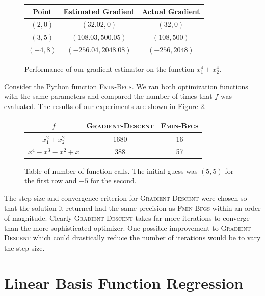 \documentclass{sigchi}
\begin{document}
\begin{figure}
\def\arraystretch{1.5}

\begin{center}
\begin{tabular}{| c | c | c |}
\hline
Point & Estimated Gradient& Actual Gradient\\
\hline
$(2, 0)$& $(32.02, 0)$ & $(32, 0)$ \\
\hline
$(3, 5)$& $(108.03, 500.05)$ &$(108, 500)$\\
\hline
$(-4, 8)$&$(-256.04, 2048.08)$ & $(-256, 2048)$\\
\hline
\end{tabular}
\end{center}
\caption{Performance of our gradient estimator on the function $x_1^4 + x_2^4$.}
\end{figure}


Consider the Python function \textsc{Fmin-Bfgs}. We ran both optimization functions with the same parameters and compared the number of times that $f$ was evaluated. The results of our experiments are shown in Figure 2.

\begin{figure}
\def\arraystretch{1.5}

\begin{center}
\begin{tabular}{| c | c | c |}
\hline
$f$ & \textsc{Gradient-Descent} & \textsc{Fmin-Bfgs}\\
\hline
$x_1^2 + x_2^2$ & 1680 & 16 \\
\hline
$x^4 - x^3 - x^2 + x$ & 388 & 57\\
\hline
\end{tabular}
\end{center}
\caption{Table of number of function calls. The initial guess was $(5, 5)$ for the first row and $-5$ for the second.}
\end{figure}

The step size and convergence criterion for \textsc{Gradient-Descent} were chosen so that the solution it returned had the same precision as \textsc{Fmin-Bfgs} within an order of magnitude. Clearly \textsc{Gradient-Descent} takes far more iterations to converge than the more sophisticated optimizer. One possible improvement to \textsc{Gradient-Descent} which could drastically reduce the number of iterations would be to vary the step size.


\section{Linear Basis Function Regression}
\end{document}
